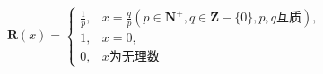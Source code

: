 \[
\mathbf{R}(x)=\left\{\begin{array}{ll}
\frac{1}{p},&x=\frac{q}{p}(p\in \mathbf{N}^{+},q\in \mathbf{Z}-\{0\},p,q\text{互质}),\\
1,&x=0,\\
0,&x\text{为无理数}
\end{array}\right.
\]